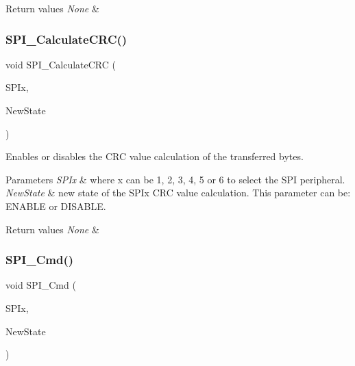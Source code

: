 \begin{DoxyRetVals}{Return values}
{\em None} & \\
\hline
\end{DoxyRetVals}
\mbox{\label{group___s_p_i_ga64f7276d119e6cb58afc100f8832adb0}} 
\subsubsection{\texorpdfstring{S\+P\+I\+\_\+\+Calculate\+C\+R\+C()}{SPI\_CalculateCRC()}}
{\footnotesize\ttfamily void S\+P\+I\+\_\+\+Calculate\+C\+RC (\begin{DoxyParamCaption}\item[{S\+P\+I\+\_\+\+Type\+Def $\ast$}]{S\+P\+Ix,  }\item[{Functional\+State}]{New\+State }\end{DoxyParamCaption})}



Enables or disables the C\+RC value calculation of the transferred bytes. 


\begin{DoxyParams}{Parameters}
{\em S\+P\+Ix} & where x can be 1, 2, 3, 4, 5 or 6 to select the S\+PI peripheral. \\
\hline
{\em New\+State} & new state of the S\+P\+Ix C\+RC value calculation. This parameter can be\+: E\+N\+A\+B\+LE or D\+I\+S\+A\+B\+LE. \\
\hline
\end{DoxyParams}

\begin{DoxyRetVals}{Return values}
{\em None} & \\
\hline
\end{DoxyRetVals}
\mbox{\label{group___s_p_i_gaa31357879a65ee1ed7223f3b9114dcf3}} 
\subsubsection{\texorpdfstring{S\+P\+I\+\_\+\+Cmd()}{SPI\_Cmd()}}
{\footnotesize\ttfamily void S\+P\+I\+\_\+\+Cmd (\begin{DoxyParamCaption}\item[{S\+P\+I\+\_\+\+Type\+Def $\ast$}]{S\+P\+Ix,  }\item[{Functional\+State}]{New\+State }\end{DoxyParamCaption})}



